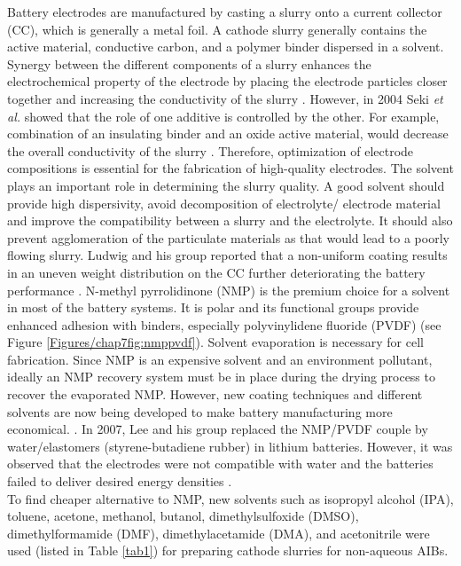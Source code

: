 Battery electrodes are manufactured by casting a slurry onto a current collector (CC), which is generally a metal foil. A cathode slurry generally contains the active material, conductive carbon, and a polymer binder dispersed in a solvent. Synergy between the different components of a slurry enhances the electrochemical property of the electrode by placing the electrode particles closer together and increasing the conductivity of the slurry \cite{zheng_cooperation_2012}.
However, in 2004 Seki \textit{et al.} showed that the role of one additive is controlled by the other. For example, combination of an insulating binder and an oxide active material, would decrease the overall conductivity of the slurry \cite{guy_novel_2006, seki_effect_2004}. Therefore, optimization of electrode compositions is essential for the fabrication of high-quality electrodes. The solvent plays an important role in determining the slurry quality. A good solvent should provide high dispersivity, avoid decomposition of electrolyte/ electrode material and improve the compatibility between a slurry and the electrolyte. It should also prevent agglomeration of the particulate materials as that would lead to a poorly flowing slurry. Ludwig and his group reported that a non-uniform coating results in an uneven weight distribution on the CC further deteriorating the battery performance \cite{ludwig_solvent-free_2016}. N-methyl pyrrolidinone (NMP) is the premium choice for a solvent in most of the battery systems. It is polar and its functional groups provide enhanced adhesion with binders, especially polyvinylidene fluoride (PVDF) (see Figure \ref{Figures/chap7fig:nmppvdf}). Solvent evaporation is necessary for cell fabrication. Since NMP is an expensive solvent and an environment pollutant, ideally an NMP recovery system must be in place during the drying process to recover the evaporated NMP. However, new coating techniques and different solvents are now being developed to make battery manufacturing more economical. \cite{liu_effective_2014,spreafico_pvdf_2014, liu_effects_2008, lee_effect_2010, wenzel_challenges_2015, lee_selection_2017, stein_non-aqueous_2016}. In 2007, Lee and his group replaced the NMP/PVDF couple by water/elastomers (styrene-butadiene rubber) in lithium batteries. However, it was observed that the electrodes were not compatible with water and the batteries failed to deliver desired energy densities \cite{lee_novel_2007, li_effects_2005}. \\
To find cheaper alternative to NMP, new solvents such as isopropyl alcohol (IPA), toluene, acetone, methanol, butanol, dimethylsulfoxide (DMSO), dimethylformamide (DMF), dimethylacetamide (DMA), and acetonitrile were used (listed in Table \ref{tab1}) for preparing cathode slurries for non-aqueous AIBs. 

